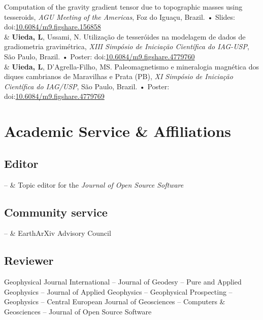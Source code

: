 \documentclass[11pt, a4paper]{article}
\newcommand{\LastName}{Uieda}
\newcommand{\Initials}{L}
\newcommand{\Me}{\textbf{\LastName, \Initials}}  %
\newcommand{\Naomi}{Ussami, N}
\newcommand{\Manoel}{D'Agrella-Filho, MS}
\newcommand{\DOI}[1]{doi:\href{https://doi.org/#1}{#1}}
\newcommand{\SlidesDOI}[1]{\newline • Slides: \DOI{#1}}
\newcommand{\PosterDOI}[1]{\newline • Poster: \DOI{#1}}
\newcommand{\Duration}[2]{\fontsize{10pt}{0}\selectfont #1--#2}
\newcommand{\Year}[1]{\fontsize{10pt}{0}\selectfont #1}
\newcommand{\Ongoing}{}
\begin{document}
\begin{EntriesTable}
  Computation of the gravity gradient tensor due to topographic masses using
  tesseroids,
  \emph{AGU Meeting of the Americas},
  Foz do Iguaçu, Brazil.
  \SlidesDOI{10.6084/m9.figshare.156858}
  \\
\Year{2008}  &
  \Me, \Naomi.
  Utilização de tesseróides na modelagem de dados de gradiometria
  gravimétrica,
  \emph{XIII Simpósio de Iniciação Científica do IAG-USP},
  São Paulo, Brazil.
  \PosterDOI{10.6084/m9.figshare.4779760}
  \\
\Year{2006}  &
  \Me, \Manoel.
  Paleomagnetismo e mineralogia magnética dos diques cambrianos de Maravilhas
  e Prata (PB),
  \emph{XI Simpósio de Iniciação Científica do IAG/USP},
  São Paulo, Brazil.
  \PosterDOI{10.6084/m9.figshare.4779769}
\end{EntriesTable}


\section{Academic Service \& Affiliations}

\subsection{Editor}

\begin{EntriesTable}
  \Duration{2019}{\Ongoing} & Topic editor for the \textit{Journal of Open Source Software}
\end{EntriesTable}

\subsection{Community service}

\begin{EntriesTable}
  \Duration{2019}{\Ongoing} & EarthArXiv Advisory Council
\end{EntriesTable}

\subsection{Reviewer}

Geophysical Journal International
--
Journal of Geodesy
--
Pure and Applied Geophysics
--
Journal of Applied Geophysics
--
Geophysical Prospecting
--
Geophysics
--
Central European Journal of Geosciences
--
Computers \& Geosciences
--
Journal of Open Source Software
\end{document}
